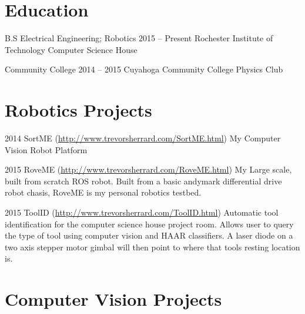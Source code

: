 \documentclass{tccv}
\begin{document}
\section{Education}

\begin{yearlist}

\item[B.S Electrical Engineering; Robotics]{2015 -- Present}
     {Rochester Institute of Technology}
     {Computer Science House}
     
\item[Community College]{2014 -- 2015}
     {Cuyahoga Community College}
     {Physics Club}
     

\end{yearlist}


\section{Robotics Projects}

\begin{yearlist}

\item{2014}
     {SortME (\href{http://www.trevorsherrard.com/SortME.html}{http://www.trevorsherrard.com\newline/SortME.html})}
     {My Computer Vision Robot Platform}
     
\item{2015}
     {RoveME (\href{http://www.trevorsherrard.com/RoveME.html}{http://www.trevorsherrard.com\newline/RoveME.html})}
     {My Large scale, built from scratch ROS robot. Built from a basic andymark differential drive robot chasis, RoveME is my personal robotics testbed.}
     
\item{2015}
	{ToolID (\href{http://www.trevorsherrard.com/ToolID.html}
	{http://www.trevorsherrard.com\newline/ToolID.html})}
	{Automatic tool identification for the computer science house project room. Allows user to query the type of tool using computer vision and HAAR classifiers. A laser diode on a two axis stepper motor gimbal will then point to where that tools resting location is.}
 

\end{yearlist}


\section{Computer Vision Projects}
\end{document}
